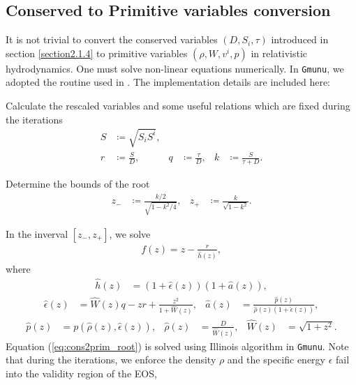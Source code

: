 \subsection{Conserved to Primitive variables conversion} 
\label{section2.1.5}
It is not trivial to convert the conserved variables $\left(D,S_i,\tau\right)$ introduced in section \ref{section2.1.4}
to primitive variables $\left(\rho, W, v^i, p\right)$ in relativistic hydrodynamics.
One must solve non-linear equations numerically.
In \texttt{Gmunu}, we adopted the routine used in \cite{galeazzi2013implementation}.
The implementation details are included here:
\begin{Step}
    \item Calculate the rescaled variables and some useful relations which are fixed during the iterations
    \begin{align}
        S &\coloneqq \sqrt{S_i S^i}, \\
        r &\coloneqq \frac{S}{D}, & q &\coloneqq \frac{\tau}{D}, & k &\coloneqq \frac{S}{\tau + D}.
    \end{align}
    \item Determine the bounds of the root
    \begin{align}
        z_- &\coloneqq \frac{k/2}{\sqrt{1-k^2/4}}, & z_+ &\coloneqq \frac{k}{\sqrt{1-k^2}}.
    \end{align}
    \item In the inverval $\left[z_-, z_+ \right]$, we solve
    \begin{align}\label{eq:cons2prim_root}
        f(z) = z - \frac{r}{\hat{h}(z)},
    \end{align}
    where
    \begin{align}
        \hat{h}(z) &= \left(1+\hat{\epsilon}(z) \right) \left( 1+ \hat{a}(z) \right),
    \end{align}
    \begin{align}
        \hat{\epsilon}(z) &= \hat{W}(z)q - zr + \frac{z^2}{1+\hat{W}(z)},
        & \hat{a}(z) &= \frac{\hat{p}(z)}{\hat{\rho}(z)\left( 1 + \hat{\epsilon}(z) \right) },
    \end{align}
    \begin{align}
        \hat{p}(z) &= p\left(\hat{\rho}(z), \hat{\epsilon}(z) \right),
        & \hat{\rho}(z) &= \frac{D}{\hat{W}(z)},
        & \hat{W}(z) &= \sqrt{1+z^2}.
    \end{align}
    Equation (\ref{eq:cons2prim_root}) is solved using Illinois algorithm in \texttt{Gmunu}.
    Note that during the iterations, we enforce the density $\rho$ and the specific energy $\epsilon$ fail into the validity region of the EOS,

\end{Step}
